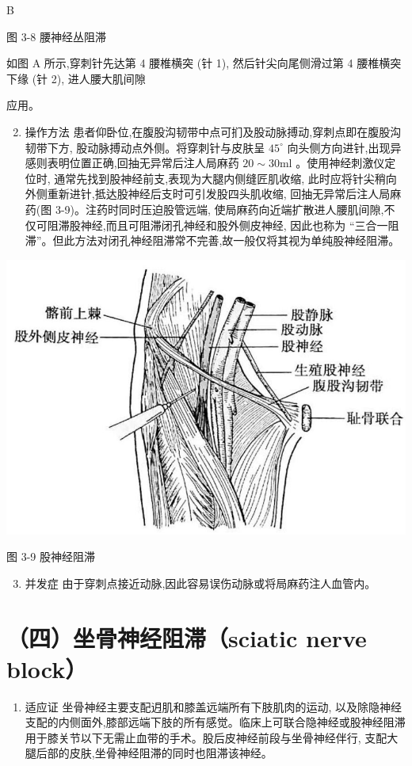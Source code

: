\documentclass[10pt]{article}
\begin{document}
B

图 3-8 腰神经丛阻滞

如图 A 所示,穿刺针先达第 4 腰椎横突 (针 1), 然后针尖向尾侧滑过第 4 腰椎横突下缘 (针 2), 进人腰大肌间隙

应用。

\begin{enumerate}
  \setcounter{enumi}{1}
  \item 操作方法 患者仰卧位,在腹股沟韧带中点可扪及股动脉搏动,穿刺点即在腹股沟韧带下方, 股动脉搏动点外侧。将穿刺针与皮肤呈 $45^{\circ}$ 向头侧方向进针,出现异感则表明位置正确,回抽无异常后注人局麻药 $20 \sim 30 \mathrm{ml}$ 。使用神经刺激仪定位时, 通常先找到股神经前支,表现为大腿内侧缝匠肌收缩, 此时应将针尖稍向外侧重新进针,抵达股神经后支时可引发股四头肌收缩, 回抽无异常后注人局麻药(图 3-9)。注药时同时压迫股管远端, 使局麻药向近端扩散进人腰肌间隙,不仅可阻滞股神经,而且可阻滞闭孔神经和股外侧皮神经, 因此也称为 “三合一阻滞”。但此方法对闭孔神经阻滞常不完善,故一般仅将其视为单纯股神经阻滞。
\end{enumerate}

\begin{center}
\includegraphics[max width=\textwidth]{2024_07_09_002a177993bd97d1d6d7g-056}
\end{center}

图 3-9 股神经阻滞

\begin{enumerate}
  \setcounter{enumi}{2}
  \item 并发症 由于穿刺点接近动脉,因此容易误伤动脉或将局麻药注人血管内。
\end{enumerate}

\section*{（四）坐骨神经阻滞（sciatic nerve block）}
\begin{enumerate}
  \item 适应证 坐骨神经主要支配迌肌和膝盖远端所有下肢肌肉的运动, 以及除隐神经支配的内侧面外,膝部远端下肢的所有感觉。临床上可联合隐神经或股神经阻滞用于膝关节以下无需止血带的手术。股后皮神经前段与坐骨神经伴行, 支配大腿后部的皮肤,坐骨神经阻滞的同时也阻滞该神经。
\end{enumerate}
\end{document}
